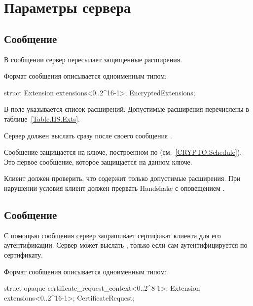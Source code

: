 \section{Параметры сервера}\label{HS.Params} 

\subsection{Сообщение }\label{HS.EE} 

В сообщении  сервер пересылает защищенные расширения.

Формат сообщения описывается одноименным типом:
%
\begin{codeblock}
struct {
  Extension extensions<0..2^16-1>;
} EncryptedExtensions;
\end{codeblock}

В поле  указывается список расширений. Допустимые расширения 
перечислены в таблице~\ref{Table.HS.Exts}.

Сервер должен выслать  сразу после своего сообщения 
.

Сообщение  защищается на ключе, построенном по 
 (см.~\ref{CRYPTO.Schedule}). Это первое 
сообщение, которое защищается на данном ключе.

Клиент должен проверить, что  содержит только 
допустимые расширения. При нарушении условия клиент должен прервать Handshake
с оповещением .

\subsection{Сообщение }\label{HS.CR} 

С помощью сообщения  сервер запрашивает сертификат 
клиента для его аутентификации. Сервер может выслать 
, только если сам аутентифицируется по сертификату.

Формат сообщения  описывается одноименным типом:
%
\begin{codeblock}
struct {
  opaque certificate_request_context<0..2^8-1>;
  Extension extensions<0..2^16-1>;
 } CertificateRequest;
\end{codeblock}


